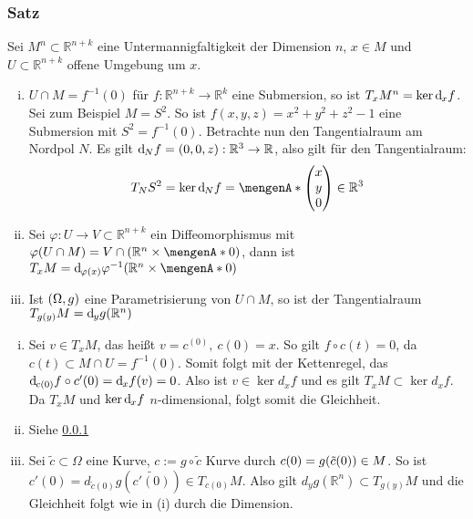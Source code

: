 \subsubsection{Satz}
\label{ssub:142}
Sei $M^n\subset \mathds{R}^{n+k}$ eine Untermannigfaltigkeit der Dimension $n$, $x\in M$ und $U\subset \mathds{R}^{n+k}$ offene Umgebung um $x$.
\begin{enumerate}[(i)]
\item $U\cap M = f^{-1}(0)$ für $f:\mathds{R}^{n+k} \to \mathds{R}^k$ eine Submersion, so ist $T_x M^n = \ker \mathrm{d}\mkern-1.0mu_x f$.\\
Sei zum Beispiel $M = S^2$. So ist $f(x,y,z)=x^2+y^2+z^2-1$ eine Submersion mit $S^2 = f^{-1}(0)$. Betrachte nun den Tangentialraum am Nordpol $N$. Es gilt $\mathrm{d}\mkern-1.0mu_N f = (0,0,z): \mathbb{R}^3 \to \mathbb{R}$, also gilt für den Tangentialraum: 
\[
T_N S^2 = \ker \mathd_N f = \set{
\begin{pmatrix}
x\\
y\\
0
\end{pmatrix}
\in \mathds{R}^3}
\]
\item Sei $\varphi: U\to V\subset \mathds{R}^{n+k}$ ein Diffeomorphismus mit $\varphi(U\cap M) = V\cap (\mathds{R}^n \times \set{0})$, dann ist $T_x M = \mathd_{\varphi(x)} \varphi^{-1}(\mathds{R}^n \times \set{0})$
\item Ist $(\Omega,g)$ eine Parametrisierung von $U\cap M$, so ist der Tangentialraum $T_{g(y)} M = \mathrm{d}\mkern-1.0mu_y g(\mathbb{R}^n)$
\end{enumerate} 
\begin{enumerate}[(i)]
\item Sei $v\in T_x M$, das heißt $v = c^(0),\ c(0) = x$. So gilt $f\circ c(t) = 0$, da $c(t)\subset M\cap U = f^{-1}(0)$. Somit folgt mit der Kettenregel, das $\mathrm{d}\mkern-1.0mu_{c(0)} f \circ c'(0) = \mathrm{d}\mkern-1.0mu_x f(v) = 0$. Also ist $v\in \ker d_x f$ und es gilt $T_x M \subset \ker d_x f$. Da $T_x M$ und $\ker \mathrm{d}\mkern-1.0mu_x f$ $n$-dimensional, folgt somit die Gleichheit.
\item Siehe \ref{ssub:142}
\item Sei $\tilde{c}\subset \Omega$ eine Kurve, $c := g\circ \tilde{c}$ Kurve durch $c(0) = g\enbrace*{\tilde{c}(0)}\in M$. So ist $c'(0) = d_{\tilde{c}(0)} g(\tilde{c'(0)})\in T_{c(0)} M$. Also gilt $d_y g(\mathds{R}^n) \subset T_{g(y)} M$ und die Gleichheit folgt wie in (i) durch die Dimension.
\end{enumerate}



